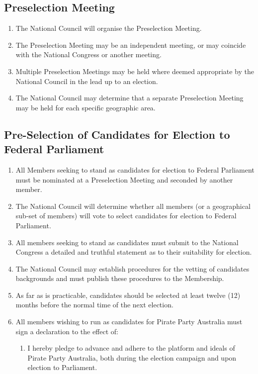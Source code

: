 \documentclass[a4paper,titlepage,8.5pt]{article}
\begin{document}
\subsection{Preselection Meeting}

\begin{enumerate}
\item The National Council will organise the Preselection Meeting.
\item The Preselection Meeting may be an independent meeting, or may coincide with the National Congress or another meeting.
\item Multiple Preselection Meetings may be held where deemed appropriate by the National Council in the lead up to an election.
\item The National Council may determine that a separate Preselection Meeting may be held for each specific geographic area.
\end{enumerate}

\subsection{Pre-Selection of Candidates for Election to Federal Parliament}

\begin{enumerate}
\item All Members seeking to stand as candidates for election to Federal Parliament must be nominated at a Preselection Meeting and seconded by another member.
\item The National Council will determine whether all members (or a geographical sub-set of members) will vote to select candidates for election to Federal Parliament.
\item All members seeking to stand as candidates must submit to the National Congress a detailed and truthful statement as to their suitability for election.
\item The National Council may establish procedures for the vetting of candidates backgrounds and must publish these procedures to the Membership. 
\item As far as is practicable, candidates should be selected at least twelve (12) months before the normal time of the next election.
\item All members wishing to run as candidates for Pirate Party Australia must sign a declaration to the effect of:
\begin{enumerate}
	\item I hereby pledge to advance and adhere to the platform and ideals of Pirate Party Australia, both during the election campaign and upon election to Parliament.
\end{enumerate}
\end{enumerate}
\end{document}
